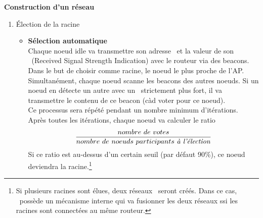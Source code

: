         \textbf{Construction d'un réseau}
        \newline
        \begin{enumerate}
            \item \'Election de la racine
                \begin{itemize}
                    \item \textbf{Sélection automatique}\\
                        Chaque noeud idle va transmettre son adresse \mac\ et
                        la valeur de son \rssi\ (Received Signal Strength Indication) avec le routeur via des beacons.
                        Dans le but de choisir comme racine, le noeud le plus proche de l'AP.\\
                        Simultanément, chaque noeud scanne les beacons des autres noeuds. Si un noeud
                        en détecte un autre avec un \rssi\ strictement plus fort, il va transmettre le contenu de
                        ce beacon (càd voter pour ce noeud).\\
                        Ce processus sera répété pendant un nombre minimum d'itérations.\\
                        Après toutes les itérations, chaque noeud va calculer le ratio
                        \[\frac{nombre\ de\ votes}{nombre\ de\ noeuds\ participants\ \textrm{\textit{à l'élection}}}\]
                        Si ce ratio est au-dessus d'un certain seuil (par défaut 90\%), ce noeud deviendra la racine.\footnote{
                            Si plusieurs racines sont élues, deux réseaux \espmesh\ seront créés.
                            Dans ce cas, \espmesh\ possède un mécanisme interne qui va fusionner les deux réseaux
                            ssi les racines sont connectées au même routeur.
                        }




\end{itemize}
\end{enumerate}
